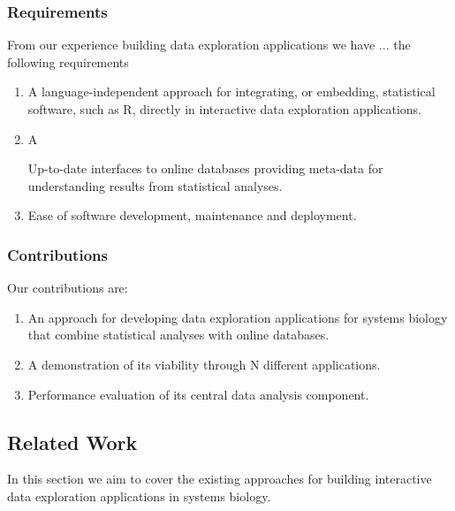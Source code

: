 \subsubsection*{Requirements} 
From our experience building data exploration applications we have  ... the
following requirements 

\begin{enumerate}
    \item A language-independent approach for integrating, or embedding,
        statistical software, such as R, directly in interactive data
        exploration applications.
    \item A 
        
        Up-to-date interfaces to online databases providing meta-data for
        understanding results from statistical analyses.
    \item Ease of software development, maintenance and deployment. 
\end{enumerate} 

\subsubsection*{Contributions} 
Our contributions are: 
\begin{enumerate}
\item An approach for developing data exploration applications for systems
biology that combine statistical analyses with online databases.  
\item A demonstration of its viability through N different applications. 
\item Performance evaluation of its central data analysis component. 
\end{enumerate} 


\subsection*{Related Work} 
In this section we aim to cover the existing approaches for building interactive
data exploration applications in systems biology. 



